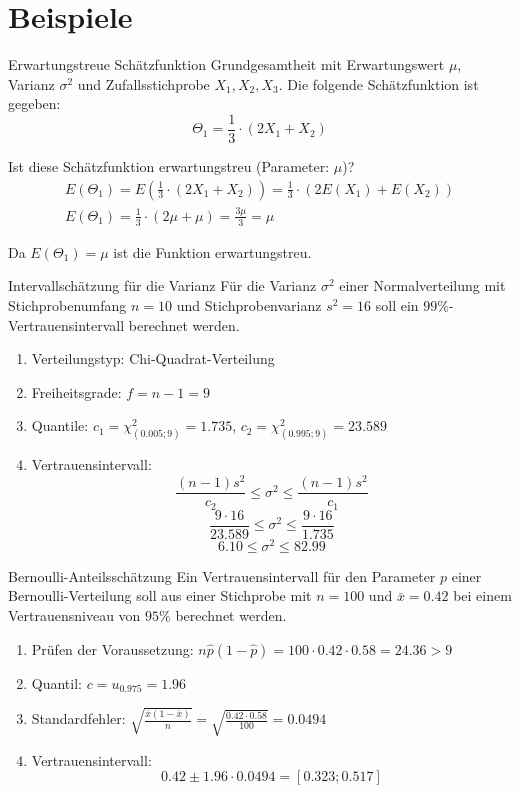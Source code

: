 \section{Beispiele}

\begin{example}{Erwartungstreue Schätzfunktion}
Grundgesamtheit mit Erwartungswert $\mu$, Varianz $\sigma^2$ und Zufallsstichprobe $X_1, X_2, X_3$. Die folgende Schätzfunktion ist gegeben:
$$
\Theta_1=\frac{1}{3} \cdot(2X_1+X_2)
$$

Ist diese Schätzfunktion erwartungstreu (Parameter: $\mu$)?
$$
\begin{gathered}
E(\Theta_1)=E(\frac{1}{3} \cdot(2X_1+X_2))=\frac{1}{3} \cdot(2E(X_1)+E(X_2)) \\
E(\Theta_1)=\frac{1}{3} \cdot(2\mu+\mu)=\frac{3\mu}{3}=\mu
\end{gathered}
$$

Da $E(\Theta_1)=\mu$ ist die Funktion erwartungstreu.
\end{example}

\begin{example}{Intervallschätzung für die Varianz}
Für die Varianz $\sigma^2$ einer Normalverteilung mit Stichprobenumfang $n=10$ und Stichprobenvarianz $s^2=16$ soll ein $99\%$-Vertrauensintervall berechnet werden.

\begin{enumerate}
  \item Verteilungstyp: Chi-Quadrat-Verteilung
  \item Freiheitsgrade: $f=n-1=9$
  \item Quantile: $c_1=\chi^2_{(0.005;9)}=1.735$, $c_2=\chi^2_{(0.995;9)}=23.589$
  \item Vertrauensintervall:
  $$
  \frac{(n-1)s^2}{c_2} \leq \sigma^2 \leq \frac{(n-1)s^2}{c_1}
  $$
  $$
  \frac{9 \cdot 16}{23.589} \leq \sigma^2 \leq \frac{9 \cdot 16}{1.735}
  $$
  $$
  6.10 \leq \sigma^2 \leq 82.99
  $$
\end{enumerate}
\end{example}

\begin{example}{Bernoulli-Anteilsschätzung}
Ein Vertrauensintervall für den Parameter $p$ einer Bernoulli-Verteilung soll aus einer Stichprobe mit $n=100$ und $\bar{x}=0.42$ bei einem Vertrauensniveau von $95\%$ berechnet werden.

\begin{enumerate}
  \item Prüfen der Voraussetzung: $n\hat{p}(1-\hat{p})=100 \cdot 0.42 \cdot 0.58 = 24.36 > 9$
  \item Quantil: $c=u_{0.975}=1.96$
  \item Standardfehler: $\sqrt{\frac{\bar{x}(1-\bar{x})}{n}}=\sqrt{\frac{0.42 \cdot 0.58}{100}}=0.0494$
  \item Vertrauensintervall:
  $$
  0.42 \pm 1.96 \cdot 0.0494 = [0.323; 0.517]
  $$
\end{enumerate}
\end{example}
